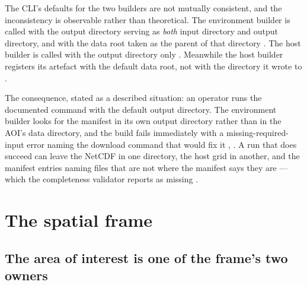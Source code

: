 \documentclass[11pt,a4paper]{article} \usepackage[utf8]{inputenc} \usepackage{lmodern} \usepackage[T1]{fontenc}
\begin{document}
The CLI's defaults for the two builders are not mutually consistent, and the inconsistency is
observable rather than theoretical. The environment builder is called with the output directory
serving as \emph{both} input directory and output directory, and with the data root taken as the
parent of that directory . The host builder is
called with the output directory only . Meanwhile the host builder registers its artefact with
the default data root, not with the directory it wrote to
.

The consequence, stated as a described situation: an operator runs the documented command
 with the default output directory. The
environment builder looks for the manifest in its own output directory rather than in the AOI's
data directory, and the build fails immediately with a missing-required-input error naming the
download command that would fix it ,
. A run that does succeed can leave the
NetCDF in one directory, the host grid in another, and the manifest entries naming files that
are not where the manifest says they are --- which the completeness validator reports as missing
.

\section{The spatial frame} \label{sec:frame}

\subsection{The area of interest is one of the frame's two owners}
\end{document}
